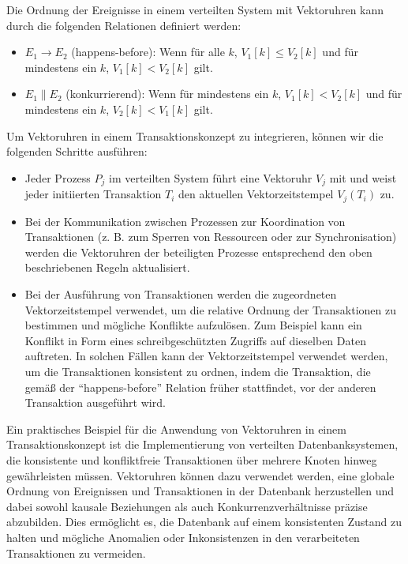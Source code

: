 \documentclass[../vs-script-first-v01.tex]{subfiles}
\begin{document}
Die Ordnung der Ereignisse in einem verteilten System mit Vektoruhren kann durch die folgenden Relationen definiert werden:
\begin{itemize}
\item $E_1 \to E_2$ (happens-before): Wenn für alle $k$, $V_1[k] \leq V_2[k]$ und für mindestens ein $k$, $V_1[k] < V_2[k]$ gilt.
\item $E_1 \parallel E_2$ (konkurrierend): Wenn für mindestens ein $k$, $V_1[k] < V_2[k]$ und für mindestens ein $k$, $V_2[k] < V_1[k]$ gilt.
\end{itemize}
Um Vektoruhren in einem Transaktionskonzept zu integrieren, können wir die folgenden Schritte ausführen:
\begin{itemize}
\item Jeder Prozess $P_j$ im verteilten System führt eine Vektoruhr $V_j$ mit und weist jeder initiierten Transaktion $T_i$ den aktuellen Vektorzeitstempel $V_j(T_i)$ zu.
\item Bei der Kommunikation zwischen Prozessen zur Koordination von Transaktionen (z. B. zum Sperren von Ressourcen oder zur Synchronisation) werden die Vektoruhren der beteiligten Prozesse entsprechend den oben beschriebenen Regeln aktualisiert.
\item Bei der Ausführung von Transaktionen werden die zugeordneten Vektorzeitstempel verwendet, um die relative Ordnung der Transaktionen zu bestimmen und mögliche Konflikte aufzulösen. Zum Beispiel kann ein Konflikt in Form eines schreibgeschützten Zugriffs auf dieselben Daten auftreten. In solchen Fällen kann der Vektorzeitstempel verwendet werden, um die Transaktionen konsistent zu ordnen, indem die Transaktion, die gemäß der \enquote{happens-before} Relation früher stattfindet, vor der anderen Transaktion ausgeführt wird.
\end{itemize}
Ein praktisches Beispiel für die Anwendung von Vektoruhren in einem Transaktionskonzept ist die Implementierung von verteilten Datenbanksystemen, die konsistente und konfliktfreie Transaktionen über mehrere Knoten hinweg gewährleisten müssen. Vektoruhren können dazu verwendet werden, eine globale Ordnung von Ereignissen und Transaktionen in der Datenbank herzustellen und dabei sowohl kausale Beziehungen als auch Konkurrenzverhältnisse präzise abzubilden. Dies ermöglicht es, die Datenbank auf einem konsistenten Zustand zu halten und mögliche Anomalien oder Inkonsistenzen in den verarbeiteten Transaktionen zu vermeiden.
\end{document}
